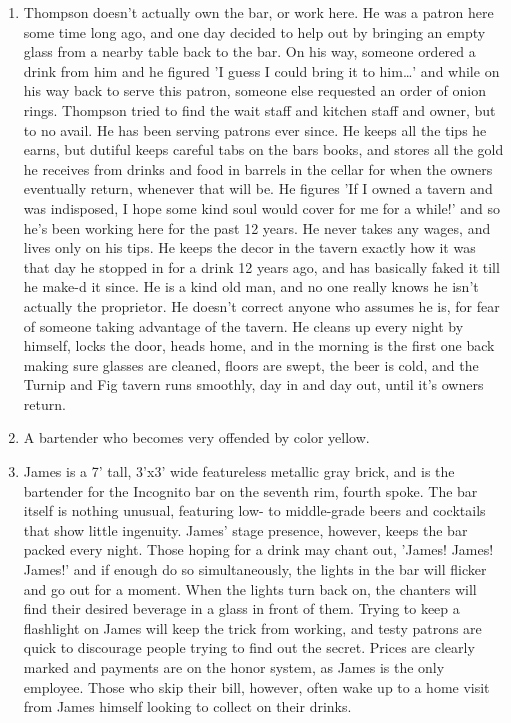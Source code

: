 \documentclass{article}
\begin{document}
\begin{enumerate}
	\item Thompson doesn't actually own the bar, or work here. He was a patron here some time long ago, and one day decided to help out by bringing an empty glass from a nearby table back to the bar. On his way, someone ordered a drink from him and he figured 'I guess I could bring it to him…' and while on his way back to serve this patron, someone else requested an order of onion rings. Thompson tried to find the wait staff and kitchen staff and owner, but to no avail. He has been serving patrons ever since. He keeps all the tips he earns, but dutiful keeps careful tabs on the bars books, and stores all the gold he receives from drinks and food in barrels in the cellar for when the owners eventually return, whenever that will be. He figures 'If I owned a tavern and was indisposed, I hope some kind soul would cover for me for a while!' and so he's been working here for the past 12 years. He never takes any wages, and lives only on his tips. He keeps the decor in the tavern exactly how it was that day he stopped in for a drink 12 years ago, and has basically faked it till he make-d it since. He is a kind old man, and no one really knows he isn't actually the proprietor. He doesn't correct anyone who assumes he is, for fear of someone taking advantage of the tavern. He cleans up every night by himself, locks the door, heads home, and in the morning is the first one back making sure glasses are cleaned, floors are swept, the beer is cold, and the Turnip and Fig tavern runs smoothly, day in and day out, until it's owners return.
	\item A bartender who becomes very offended by color yellow.
	\item James is a 7' tall, 3'x3' wide featureless metallic gray brick, and is the bartender for the Incognito bar on the seventh rim, fourth spoke. The bar itself is nothing unusual, featuring low- to middle-grade beers and cocktails that show little ingenuity. James' stage presence, however, keeps the bar packed every night. Those hoping for a drink may chant out, 'James! James! James!' and if enough do so simultaneously, the lights in the bar will flicker and go out for a moment. When the lights turn back on, the chanters will find their desired beverage in a glass in front of them. Trying to keep a flashlight on James will keep the trick from working, and testy patrons are quick to discourage people trying to find out the secret. Prices are clearly marked and payments are on the honor system, as James is the only employee. Those who skip their bill, however, often wake up to a home visit from James himself looking to collect on their drinks.

\end{enumerate}
\end{document}
